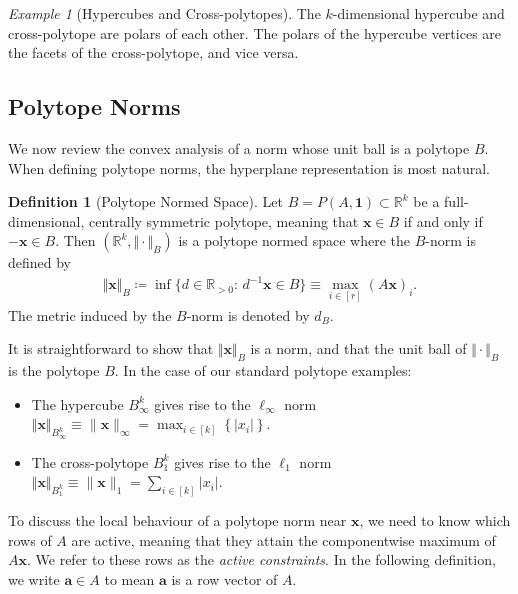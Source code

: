 \documentclass[10pt]{article}
\theoremstyle{definition}
\newtheorem{definition}[theorem]{Definition}
\theoremstyle{remark}
\newtheorem{example}[theorem]{Example}
\newcommand{\R}{\mathbb{R}}
\newcommand{\norm}[2]{\Vert #2 \Vert_{#1}}
\renewcommand{\vec}[1]{\mathbf{#1}}
\begin{document}
	\begin{example}[Hypercubes and Cross-polytopes]
		The $k$-dimensional hypercube and cross-polytope are polars of each other. The polars of the hypercube vertices are the facets of the cross-polytope, and vice versa.
	\end{example}
	
	\subsection{Polytope Norms}
	
	We now review the convex analysis of a norm whose unit ball is a polytope $B$. When defining polytope norms, the hyperplane representation is most natural.
	
	\begin{definition}[Polytope Normed Space]
		Let $B = P(A, \vec 1) \subset \R^k$ be a full-dimensional, centrally symmetric polytope, meaning that $\vec x \in B$ if and only if $- \vec x \in B$. Then $(\R^k, \norm{B}{\cdot})$ is a polytope normed space where the $B$-norm is defined by
		\begin{align}
			\label{eqn:BnormDefinition}
			\norm{B}{\vec x} \coloneqq \inf \{ d \in \R_{>0}: \,  d^{-1}\vec x \in B \} \equiv \max_{i \in [r]} (A \vec x)_i.
		\end{align}
		The metric induced by the $B$-norm is denoted by $d_B$. 
	\end{definition}
	
	It is straightforward to show that $\norm{B}{\vec x}$ is a norm, and that the unit ball of $\norm{B}{\cdot}$ is the polytope $B$. In the case of our standard polytope examples:
	
	\begin{itemize}
		\item The hypercube $B_{\infty}^k$ gives rise to the $\ell_{\infty}$ norm $\norm{B_{\infty}^k}{\vec x} \equiv \|\vec x \|_{\infty} = \max_{i \in [k]} \left \{ |x_i| \right \}$.
		\item The cross-polytope $B_{1}^k$ gives rise to the $\ell_{1}$ norm $\norm{B_{1}^k}{\vec x} \equiv \|\vec x \|_{1} = \sum_{i \in [k]} |x_i|$.
	\end{itemize}
	
	To discuss the local behaviour of a polytope norm near $\vec x$, we need to know which rows of $A$ are active, meaning that they attain the componentwise maximum of $A\vec x$. We refer to these rows as the \emph{active constraints}. In the following definition, we write $\vec a \in A$ to mean $\vec a$ is a row vector of $A$.
	
\end{document}
